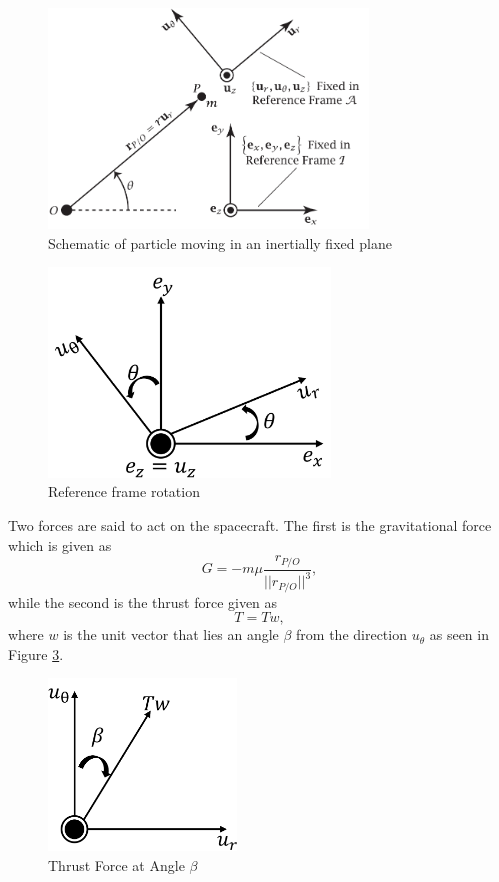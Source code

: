 \documentclass[]{article}
\begin{document}
\begin{figure}
	\centering
    \includegraphics[width=85mm,scale=0.85]{midterm_schematic.png}
	\caption{Schematic of particle moving in an inertially fixed plane}
	\label{fig:schematic}
\end{figure}
\begin{figure}
	\centering
	\includegraphics[width=75mm,scale=0.75]{rotation.png}
	\caption{Reference frame rotation}
	\label{fig:rotation2}
\end{figure}
Two forces are said to act on the spacecraft. The first is the gravitational force which is given as
\begin{equation} \label{grav_force}
	G = -m\mu\frac{r_{P/O}}{||r_{P/O}||^3},
\end{equation}
while the second is the thrust force given as\\
\begin{equation} \label{thrust_force}
	T = Tw,
\end{equation}
where \(w\) is the unit vector that lies an angle \(\beta\) from the direction \(u_{\theta}\) as seen in Figure \ref{fig:beta}.
\begin{figure}
	\centering
	\includegraphics[width=50mm,scale=0.5]{beta.png}
	\caption{Thrust Force at Angle \(\beta\)}
	\label{fig:beta}
\end{figure}
\end{document}
